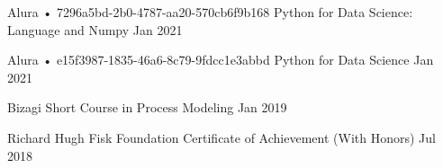 \begin{cventries}
  \cventry
    {Alura • 7296a5bd-2b0-4787-aa20-570cb6f9b168} %
    {Python for Data Science: Language and Numpy} %
    {} %
    {Jan 2021} %
    {}

  \cventry
    {Alura • e15f3987-1835-46a6-8c79-9fdcc1e3abbd} %
    {Python for Data Science} %
    {} %
    {Jan 2021} %
    {}

  \cventry
    {Bizagi} %
    {Short Course in Process Modeling} %
    {} %
    {Jan 2019} %
    {}

  \cventry
    {Richard Hugh Fisk Foundation} %
    {Certificate of Achievement (With Honors)} %
    {} %
    {Jul 2018} %
    {}

\end{cventries} 